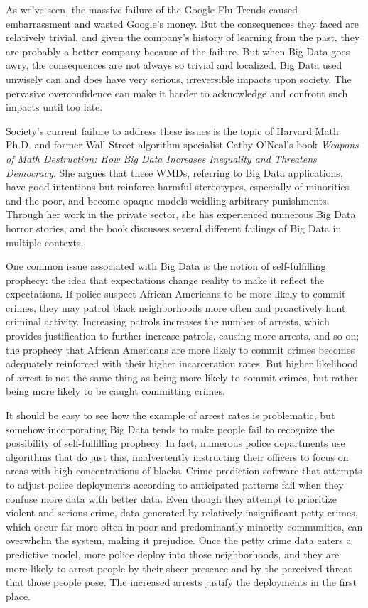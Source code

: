 \documentclass[sigconf]{acmart}
\begin{document}
	As we've seen, the massive failure of the Google Flu Trends caused embarrassment and wasted Google's money. But the consequences they faced are relatively trivial, and given the company's history of learning from the past, they are probably a better company because of the failure. But when Big Data goes awry, the consequences are not always so trivial and localized. Big Data used unwisely can and does have very serious, irreversible impacts upon society. The pervasive overconfidence can make it harder to acknowledge and confront such impacts until too late. 

	Society's current failure to address these issues is the topic of Harvard Math Ph.D. and former Wall Street algorithm specialist Cathy O'Neal's book {\em Weapons of Math Destruction: How Big Data Increases Inequality and Threatens Democracy}. She argues that these WMDs, referring to Big Data applications, have good intentions but reinforce harmful stereotypes, especially of minorities and the poor, and become opaque models weidling arbitrary punishments. Through her work in the private sector, she has experienced numerous Big Data horror stories, and the book discusses several different failings of Big Data in multiple contexts.

	One common issue associated with Big Data is the notion of self-fulfilling prophecy: the idea that expectations change reality to make it reflect the expectations. If police suspect African Americans to be more likely to commit crimes, they may patrol black neighborhoods more often and proactively hunt criminal activity. Increasing patrols increases the number of arrests, which provides justification to further increase patrols, causing more arrests, and so on; the prophecy that African Americans are more likely to commit crimes becomes adequately reinforced with their higher incarceration rates. But higher likelihood of arrest is not the same thing as being more likely to commit crimes, but rather being more likely to be caught committing crimes\cite{Liu2017}.

	It should be easy to see how the example of arrest rates is problematic, but somehow incorporating Big Data tends to make people fail to recognize the possibility of self-fulfilling prophecy. In fact, numerous police departments use algorithms that do just this, inadvertently instructing their officers to focus on areas with high concentrations of blacks. Crime prediction software that attempts to adjust police deployments according to anticipated patterns fail when they confuse more data with better data. Even though they attempt to prioritize violent and serious crime, data generated by relatively insignificant petty crimes, which occur far more often in poor and predominantly minority communities, can overwhelm the system, making it prejudice. Once the petty crime data enters a predictive model, more police deploy into those neighborhoods, and they are more likely to arrest people by their sheer presence and by the perceived threat that those people pose. The increased arrests justify the deployments in the first place\cite{Wharton2016}. 
\end{document}
